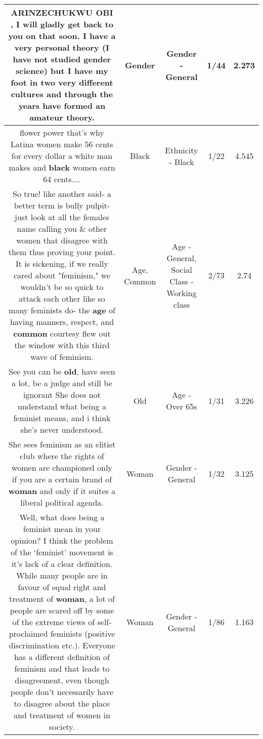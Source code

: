\documentclass[11pt]{article}
\newlength\mylength
\begin{document}
\begin{center}
\begin{longtable}{|C{.65\mylength}|C{.30\mylength}|C{.12\mylength}|C{.12\mylength}|C{.12\mylength}|}
  \small ARINZECHUKWU OBI
, I will gladly get back to you on that soon. I have a very personal theory (I have not studied \textbf{gender} science) but I have my foot in two very different cultures and through the years have formed an amateur theory.\normalsize   & Gender & Gender - General & 1/44 & 2.273 \\  \hline
  \small flower power that's why Latina women make 56 cents for every dollar a white man makes and \textbf{black} women earn 64 cents....\normalsize   & Black & Ethnicity - Black & 1/22 & 4.545 \\  \hline
  \small So true! like another said- a better term is bully pulpit- just look at all the females name calling you \& other women that disagree with them thus proving your point. It is sickening, if we really cared about "feminism," we wouldn't be so quick to attack each other like so many feminists do- the \textbf{age} of having manners, respect, and \textbf{common} courtesy flew out the window with this third wave of feminism.\normalsize   & Age, Common & Age - General, Social Class - Working class & 2/73 & 2.74 \\  \hline
  \small See you can be \textbf{old}, have seen a lot, be a judge and still be ignorant She does not understand what being a feminist means, and i think she's never understood.\normalsize   & Old & Age - Over 65s & 1/31 & 3.226 \\  \hline
  \small She sees feminism as an elitist club where the rights of women are championed only if you are a certain brand of \textbf{woman} and only if it suites a liberal political agenda.\normalsize   & Woman & Gender - General & 1/32 & 3.125 \\  \hline
  \small Well, what does being a feminist mean in your opinion? I think the problem of the ‘feminist' movement is it's lack of a clear definition. While many people are in favour of equal right and treatment of \textbf{woman}, a lot of people are scared off by some of the extreme views of self-proclaimed feminists (positive discrimination etc.). Everyone has a different definition of feminism and that leads to disagreement, even though people don't necessarily have to disagree about the place and treatment of women in society.\normalsize   & Woman & Gender - General & 1/86 & 1.163 \\  \hline

\end{longtable}
\end{center}
\end{document}
